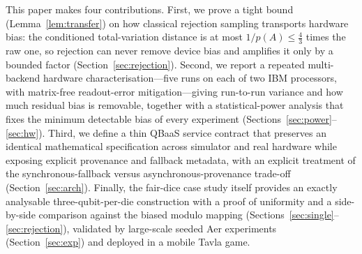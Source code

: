 \documentclass{ieeeaccess}
\begin{document}
This paper makes four contributions. First, we prove a tight bound (Lemma~\ref{lem:transfer}) on how classical rejection sampling transports hardware bias: the conditioned total-variation distance is at most $1/p(A)\le\tfrac43$ times the raw one, so rejection can never remove device bias and amplifies it only by a bounded factor (Section~\ref{sec:rejection}). Second, we report a repeated multi-backend hardware characterisation---five runs on each of two IBM processors, with matrix-free readout-error mitigation---giving run-to-run variance and how much residual bias is removable, together with a statistical-power analysis that fixes the minimum detectable bias of every experiment (Sections~\ref{sec:power}--\ref{sec:hw}). Third, we define a thin QBaaS service contract that preserves an identical mathematical specification across simulator and real hardware while exposing explicit provenance and fallback metadata, with an explicit treatment of the synchronous-fallback versus asynchronous-provenance trade-off (Section~\ref{sec:arch}). Finally, the fair-dice case study itself provides an exactly analysable three-qubit-per-die construction with a proof of uniformity and a side-by-side comparison against the biased modulo mapping (Sections~\ref{sec:single}--\ref{sec:rejection}), validated by large-scale seeded Aer experiments (Section~\ref{sec:exp}) and deployed in a mobile Tavla game.
\end{document}
